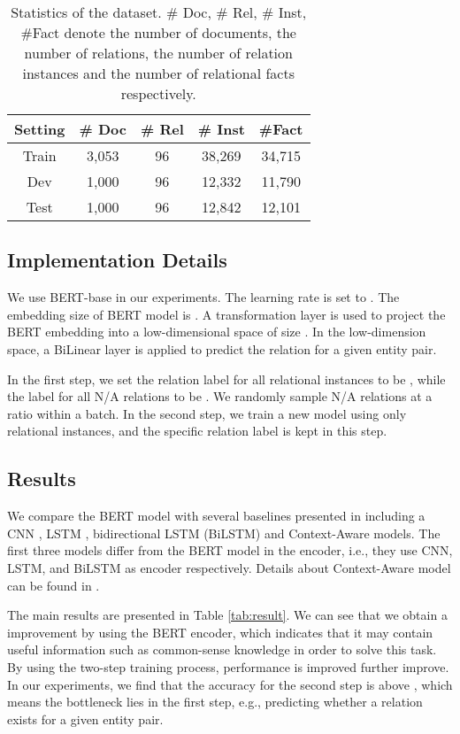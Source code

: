 \documentclass[11pt,a4paper]{article}
\begin{document}
\begin{table}[]
    \centering
    \begin{tabular}{c|c|c|c|c}
    \toprule
        Setting & \# Doc & \# Rel & \# Inst & \#Fact \\\midrule
        Train & 3,053 & 96 & 38,269 & 34,715 \\
        Dev & 1,000 & 96 & 12,332 & 11,790 \\
        Test & 1,000 & 96 & 12,842 & 12,101\\\bottomrule
    \end{tabular}
    \caption{Statistics of the dataset. \# Doc,  \# Rel, \# Inst, \#Fact denote the number of documents, the number of relations, the number of relation instances and the number of relational facts respectively.}
    \label{tab:statics}
\end{table}

\subsection{Implementation Details}
We use BERT-base in our experiments. The learning rate is set to . The embedding size of BERT model is . A transformation layer is used to project the BERT embedding into a low-dimensional space of size . In the low-dimension space, a BiLinear layer is applied to predict the relation for a given entity pair.

In the first step, we set the relation label for all relational instances to be , while the label for all N/A relations to be . We randomly sample N/A relations at a ratio  within a batch. In the second step, we train a new model using only relational instances, and the specific relation label is kept in this step.

\subsection{Results}
We compare the BERT model with several baselines presented in \cite{yao2019DocRED} including a CNN \cite{CNN}, LSTM \cite{BiLSTM}, bidirectional LSTM (BiLSTM) \cite{BiLSTM_RE} and Context-Aware models.
The first three models differ from the BERT model in the encoder, i.e., they use CNN, LSTM, and BiLSTM as encoder respectively. Details about Context-Aware model can be found in \cite{Context_aware}.

The main results are presented in Table \ref{tab:result}. We can see that we obtain a   improvement by using the BERT encoder, which indicates that it may contain useful information such as common-sense knowledge in order to solve this task. By using the two-step training process, performance is improved further improve. In our experiments, we find that the accuracy for the second step is above , which means the bottleneck lies in the first step, e.g., predicting whether a relation exists for a given entity pair.
\end{document}
